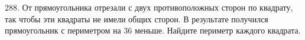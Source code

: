 288. От прямоугольника отрезали с двух противоположных сторон по квадрату, так чтобы эти квадраты не имели общих сторон. В результате получился прямоугольник с периметром на 36 меньше. Найдите периметр каждого квадрата.\\
